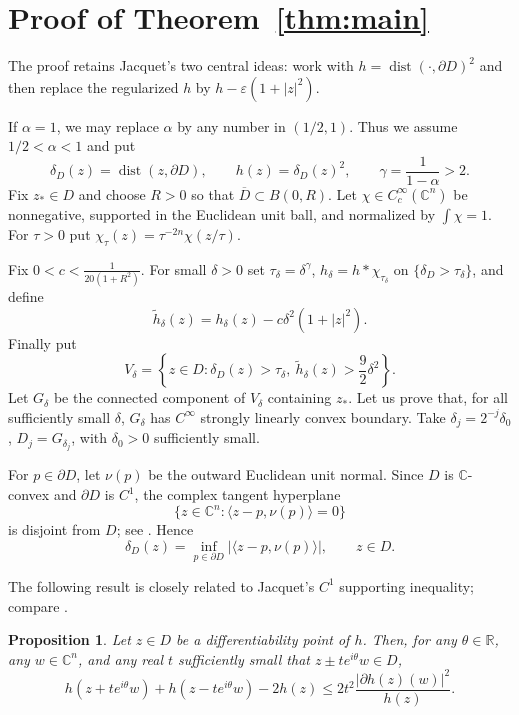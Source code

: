\documentclass[12pt]{amsart}
\newtheorem{proposition}[theorem]{Proposition}
\newcommand{\C}{\mathbb C}
\begin{document}
\section{Proof of Theorem~\ref{thm:main}}

The proof retains Jacquet's two central ideas: work with $h=\operatorname{dist}(\cdot,\partial D)^2$ and then replace the regularized $h$ by $h-\varepsilon(1+|z|^2)$. 

If $\alpha=1$, we may replace $\alpha$ by any number in $(1/2,1)$. Thus we assume $1/2<\alpha<1$ and put
\[
 \delta_D(z)=\operatorname{dist}(z,\partial D),\qquad
 h(z)=\delta_D(z)^2,\qquad
 \gamma=\frac1{1-\alpha}>2.
\]
Fix $z_*\in D$ and choose $R>0$ so that $\overline D\subset B(0,R)$. Let
$\chi\in C_c^\infty(\C^n)$ be nonnegative, supported in the Euclidean unit
ball, and normalized by $\int\chi=1$. For $\tau>0$ put
$\chi_\tau(z)=\tau^{-2n}\chi(z/\tau)$.

Fix $0<c<\frac1{20(1+R^2)}$.
For small $\delta>0$ set
$\tau_\delta=\delta^\gamma$, $h_\delta=h*\chi_{\tau_\delta}$
on $\{\delta_D>\tau_\delta\}$, and define
\[
 \widetilde h_\delta(z)=h_\delta(z)-c\delta^2(1+|z|^2).
\]
Finally put
\begin{equation}\label{eq:Vdelta}
 V_\delta=
 \left\{z\in D:\delta_D(z)>\tau_\delta,\ 
 \widetilde h_\delta(z)>\frac92\delta^2\right\}.
\end{equation}
Let $G_\delta$ be the connected component of $V_\delta$ containing $z_*$. Let us
prove that, for all sufficiently small $\delta$, $G_\delta$ has $C^\infty$ strongly
linearly convex boundary. Take
$\delta_j=2^{-j}\delta_0$, $D_j=G_{\delta_j}$,
with $\delta_0>0$ sufficiently small.

For $p\in\partial D$, let $\nu(p)$ be the outward Euclidean unit normal.
Since $D$ is $\C$-convex and $\partial D$ is $C^1$, the
complex tangent hyperplane
\[
 \{z\in\C^n:\langle z-p,\nu(p)\rangle=0\}
\]
is disjoint from $D$; see \cite{APS,NT}. Hence
\begin{equation}\label{eq:envelope}
 \delta_D(z)=
 \inf_{p\in\partial D}|\langle z-p,\nu(p)\rangle|,
 \qquad z\in D.
\end{equation}

The following result is closely related to Jacquet's $C^1$ supporting inequality; compare \cite[Lemma~3.1.4]{Jac08}.

\begin{proposition}\label{prop:second-difference}
Let $z\in D$ be a differentiability point of $h$. Then, for any
$\theta\in\mathbb R$, any $w\in\C^n$, and any real $t$ sufficiently small
that $z\pm te^{i\theta}w\in D$,
\begin{equation}\label{eq:second-difference}
 h(z+t e^{i\theta}w)+h(z-t e^{i\theta}w)-2h(z)
 \le 2t^2\frac{|\partial h(z)(w)|^2}{h(z)}.
\end{equation}
\end{proposition}
\end{document}
